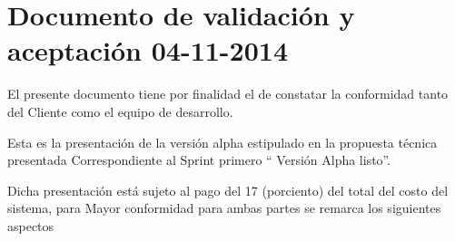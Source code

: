 \chapter{Documento de validaci\'{o}n y aceptaci\'{o}n 04-11-2014}

El presente documento tiene por finalidad el de constatar la conformidad tanto
del Cliente como el equipo de desarrollo.

Esta es la presentaci\'{o}n de la versi\'{o}n alpha estipulado en la propuesta
t\'{e}cnica presentada Correspondiente al Sprint primero \textquotedblleft 
Versi\'{o}n Alpha listo\textquotedblright.

Dicha presentaci\'{o}n est\'{a} sujeto al pago del 17 (porciento) del total del
costo del sistema, para Mayor conformidad para ambas partes se remarca los
siguientes aspectos

